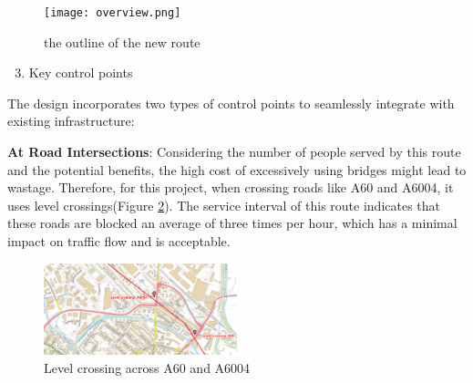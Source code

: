 \documentclass[letterpaper,12pt,leqno]{article}
\begin{document}
	\begin{figure}[H]
		\centering
		\texttt{[image: overview.png]}
		\caption{the outline of the new route}
		\label{fig:outline}
	\end{figure}
	
	\begin{enumerate}
		\setcounter{enumi}{2}
		\item
		Key control points
	\end{enumerate}
	
	The design incorporates two types of control points to seamlessly
	integrate with existing infrastructure:
	
	
	\textbf{At Road Intersections}: Considering the number of people served by this route and the potential benefits, the high cost of excessively using bridges might lead to wastage. Therefore, for this project, when crossing roads like A60 and A6004, it uses level crossings(Figure \ref{fig:level crossing}). The service interval of this route indicates that these roads are blocked an average of three times per hour, which has a minimal impact on traffic flow and is acceptable.

 \begin{figure}[H]
     \includegraphics[width=0.5\textwidth]{A60.png}
     \caption{Level crossing across A60 and A6004}
     \label{fig:level crossing}
 \end{figure}
\end{document}
